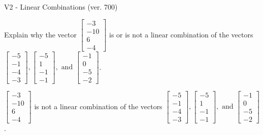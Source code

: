 \begin{exercise}
  \begin{exerciseTitle}V2 - Linear Combinations (ver. 700)\end{exerciseTitle}
  \begin{exerciseStatement}
    Explain why the vector \(\left[\begin{array}{c}
-3 \\
-10 \\
6 \\
-4
\end{array}\right]\)  is or is not a linear 
	combination of the vectors \(\left[\begin{array}{c}
-5 \\
-1 \\
-4 \\
-3
\end{array}\right] , \left[\begin{array}{c}
-5 \\
1 \\
-1 \\
-1
\end{array}\right] , \text{ and } \left[\begin{array}{c}
-1 \\
0 \\
-5 \\
-2
\end{array}\right]\).
	


  \end{exerciseStatement}
  \begin{exerciseAnswer}
   \(\left[\begin{array}{c}
-3 \\
-10 \\
6 \\
-4
\end{array}\right]\) 
  	 is not  
	a linear combination of the vectors \(\left[\begin{array}{c}
-5 \\
-1 \\
-4 \\
-3
\end{array}\right] , \left[\begin{array}{c}
-5 \\
1 \\
-1 \\
-1
\end{array}\right] , \text{ and } \left[\begin{array}{c}
-1 \\
0 \\
-5 \\
-2
\end{array}\right]\).

	
  


  \end{exerciseAnswer}
\end{exercise}